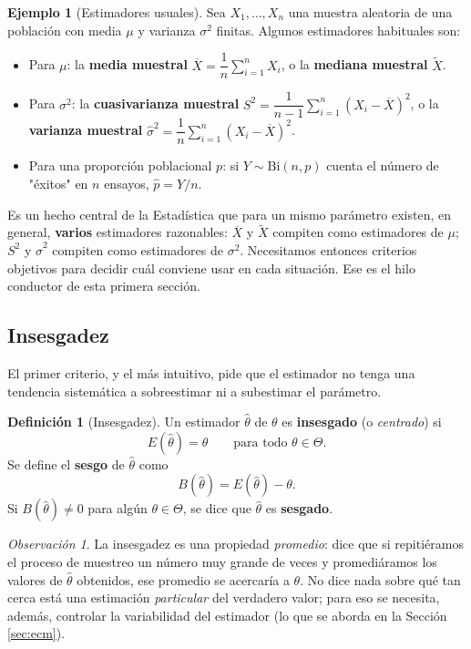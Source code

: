 \documentclass[11pt,a4paper]{article}
\theoremstyle{plain}
\theoremstyle{definition}
\newtheorem{definicion}[teorema]{Definición}
\newtheorem{ejemplo}[teorema]{Ejemplo}
\theoremstyle{remark}
\newtheorem{observacion}[teorema]{Observación}
\begin{document}
\begin{ejemplo}[Estimadores usuales]
Sea $X_1,\dots,X_n$ una muestra aleatoria de una población con media $\mu$ y varianza $\sigma^2$ finitas. Algunos estimadores habituales son:
\begin{itemize}
\item Para $\mu$: la \textbf{media muestral} $\overline X = \dfrac{1}{n}\sum_{i=1}^n X_i$, o la \textbf{mediana muestral} $\widetilde X$.
\item Para $\sigma^2$: la \textbf{cuasivarianza muestral} $S^2 = \dfrac{1}{n-1}\sum_{i=1}^n (X_i-\overline X)^2$, o la \textbf{varianza muestral} $\widehat\sigma^2 = \dfrac{1}{n}\sum_{i=1}^n (X_i-\overline X)^2$.
\item Para una proporción poblacional $p$: si $Y\sim\text{Bi}(n,p)$ cuenta el número de "éxitos" en $n$ ensayos, $\widehat p = Y/n$.
\end{itemize}
Es un hecho central de la Estadística que para un mismo parámetro existen, en general, \textbf{varios} estimadores razonables: $\overline X$ y $\widetilde X$ compiten como estimadores de $\mu$; $S^2$ y $\widehat\sigma^2$ compiten como estimadores de $\sigma^2$. Necesitamos entonces criterios objetivos para decidir cuál conviene usar en cada situación. Ese es el hilo conductor de esta primera sección.
\end{ejemplo}

\subsection{Insesgadez}

El primer criterio, y el más intuitivo, pide que el estimador no tenga una tendencia sistemática a sobreestimar ni a subestimar el parámetro.

\begin{definicion}[Insesgadez]
Un estimador $\widehat\theta$ de $\theta$ es \textbf{insesgado} (o \emph{centrado}) si
\[
E(\widehat\theta) = \theta \qquad \text{para todo } \theta \in \Theta.
\]
Se define el \textbf{sesgo} de $\widehat\theta$ como
\[
B(\widehat\theta) = E(\widehat\theta) - \theta.
\]
Si $B(\widehat\theta)\neq 0$ para algún $\theta\in\Theta$, se dice que $\widehat\theta$ es \textbf{sesgado}.
\end{definicion}

\begin{observacion}
La insesgadez es una propiedad \emph{promedio}: dice que si repitiéramos el proceso de muestreo un número muy grande de veces y promediáramos los valores de $\widehat\theta$ obtenidos, ese promedio se acercaría a $\theta$. No dice nada sobre qué tan cerca está una estimación \emph{particular} del verdadero valor; para eso se necesita, además, controlar la variabilidad del estimador (lo que se aborda en la Sección \ref{sec:ecm}).
\end{observacion}
\end{document}
